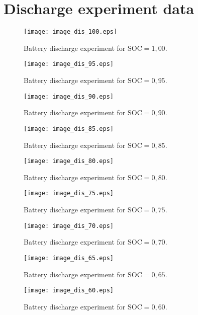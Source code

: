 \section{Discharge experiment data}
\vfill
\begin{figure}[h!]
	\centering
  	\texttt{[image: image\_dis\_100.eps]}
  	\caption{Battery discharge experiment for $\mathrm{SOC} = 1,00$.}
	\label{fig:image_dis_100}
\end{figure}
\vfill
\begin{figure}[h!]
	\centering
  	\texttt{[image: image\_dis\_95.eps]}
	\caption{Battery discharge experiment for $\mathrm{SOC} = 0,95$.}
	\label{fig:image_dis_95}
\end{figure}
\begin{figure}[h!]
	\centering
  	\texttt{[image: image\_dis\_90.eps]}
  	\caption{Battery discharge experiment for $\mathrm{SOC} = 0,90$.}
	\label{fig:image_dis_90}
\end{figure}
\begin{figure}[h!]
	\centering
  	\texttt{[image: image\_dis\_85.eps]}
  	\caption{Battery discharge experiment for $\mathrm{SOC} = 0,85$.}
	\label{fig:image_dis_85}
\end{figure}
\begin{figure}[h!]
	\centering
  	\texttt{[image: image\_dis\_80.eps]}
  	\caption{Battery discharge experiment for $\mathrm{SOC} = 0,80$.}
	\label{fig:image_dis_80}
\end{figure}
\begin{figure}[h!]
	\centering
  	\texttt{[image: image\_dis\_75.eps]}
  	\caption{Battery discharge experiment for $\mathrm{SOC} = 0,75$.}
	\label{fig:image_dis_75}
\end{figure}
\begin{figure}[h!]
	\centering
  	\texttt{[image: image\_dis\_70.eps]}
  	\caption{Battery discharge experiment for $\mathrm{SOC} = 0,70$.}
	\label{fig:image_dis_70}
\end{figure}
\begin{figure}[h!]
	\centering
  	\texttt{[image: image\_dis\_65.eps]}
  	\caption{Battery discharge experiment for $\mathrm{SOC} = 0,65$.}
	\label{fig:image_dis_65}
\end{figure}
\begin{figure}[h!]
	\centering
  	\texttt{[image: image\_dis\_60.eps]}
  	\caption{Battery discharge experiment for $\mathrm{SOC} = 0,60$.}
	\label{fig:image_dis_60}
\end{figure}
